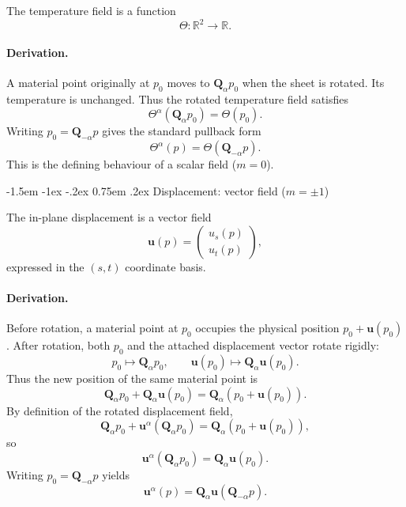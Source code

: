 \documentclass[12pt]{article}
\makeatletter
\renewcommand\subsection{\@startsection{subsection}{2}{\z@}%
                                     {-1.5em \@plus -1ex \@minus -.2ex}%
                                     {0.75em \@plus .2ex}%
                                     {\normalfont\large\bfseries}}
\makeatother
\begin{document}
The temperature field is a function
\[
  \Theta : \mathbb{R}^2 \to \mathbb{R}.
\]

\paragraph{Derivation.}
A material point originally at $p_0$ moves to $\mathbf{Q}_\alpha p_0$
when the sheet is rotated. Its temperature is unchanged. Thus the
rotated temperature field satisfies
\[
  \Theta^\alpha(\mathbf{Q}_\alpha p_0) = \Theta(p_0).
\]
Writing $p_0 = \mathbf{Q}_{-\alpha}p$ gives the standard pullback form
\begin{equation}
  \label{eq:temperature-rotation}
  \Theta^\alpha(p) = \Theta(\mathbf{Q}_{-\alpha}p).
\end{equation}
This is the defining behaviour of a scalar field ($m=0$).

\subsection{Displacement: vector field (\texorpdfstring{$m=\pm1$}{m=})}

The in-plane displacement is a vector field
\[
  \mathbf{u}(p)
  =
  \begin{pmatrix}
    u_s(p)\\[3pt] u_t(p)
  \end{pmatrix},
\]
expressed in the $(s,t)$ coordinate basis.

\paragraph{Derivation.}
Before rotation, a material point at $p_0$ occupies the physical
position $p_0 + \mathbf{u}(p_0)$. After rotation, both $p_0$ and the
attached displacement vector rotate rigidly:
\[
  p_0 \mapsto \mathbf{Q}_\alpha p_0,
  \qquad
  \mathbf{u}(p_0) \mapsto \mathbf{Q}_\alpha\mathbf{u}(p_0).
\]
Thus the new position of the same material point is
\[
  \mathbf{Q}_\alpha p_0 + \mathbf{Q}_\alpha\mathbf{u}(p_0)
  = \mathbf{Q}_\alpha(p_0 + \mathbf{u}(p_0)).
\]
By definition of the rotated displacement field,
\[
  \mathbf{Q}_\alpha p_0 + \mathbf{u}^\alpha(\mathbf{Q}_\alpha p_0)
  = \mathbf{Q}_\alpha(p_0 + \mathbf{u}(p_0)),
\]
so
\begin{equation}
  \label{eq:displacement-rotation-at-Qp}
  \mathbf{u}^\alpha(\mathbf{Q}_\alpha p_0)
  = \mathbf{Q}_\alpha\mathbf{u}(p_0).
\end{equation}
Writing $p_0 = \mathbf{Q}_{-\alpha}p$ yields
\begin{equation}
  \label{eq:displacement-rotation}
  \mathbf{u}^\alpha(p)
  = \mathbf{Q}_\alpha\mathbf{u}(\mathbf{Q}_{-\alpha}p).
\end{equation}
\end{document}
